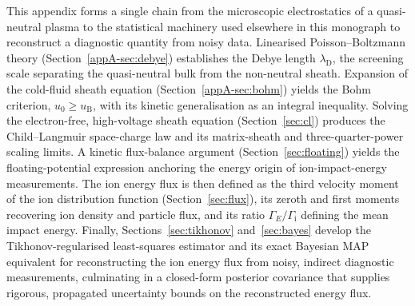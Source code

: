 This appendix forms a single chain from the microscopic electrostatics of a quasi-neutral plasma to the statistical machinery used elsewhere in this monograph to reconstruct a diagnostic quantity from noisy data. Linearised Poisson--Boltzmann theory (Section~\ref{appA-sec:debye}) establishes the Debye length $\lambda_{\mathrm{D}}$, the screening scale separating the quasi-neutral bulk from the non-neutral sheath. Expansion of the cold-fluid sheath equation (Section~\ref{appA-sec:bohm}) yields the Bohm criterion, $u_{0}\ge u_{\mathrm{B}}$, with its kinetic generalisation as an integral inequality. Solving the electron-free, high-voltage sheath equation (Section~\ref{sec:cl}) produces the Child--Langmuir space-charge law and its matrix-sheath and three-quarter-power scaling limits. A kinetic flux-balance argument (Section~\ref{sec:floating}) yields the floating-potential expression anchoring the energy origin of ion-impact-energy measurements. The ion energy flux is then defined as the third velocity moment of the ion distribution function (Section~\ref{sec:flux}), its zeroth and first moments recovering ion density and particle flux, and its ratio $\Gamma_{E}/\Gamma_{\mathrm{i}}$ defining the mean impact energy. Finally, Sections~\ref{sec:tikhonov} and~\ref{sec:bayes} develop the Tikhonov-regularised least-squares estimator and its exact Bayesian MAP equivalent for reconstructing the ion energy flux from noisy, indirect diagnostic measurements, culminating in a closed-form posterior covariance that supplies rigorous, propagated uncertainty bounds on the reconstructed energy flux.
